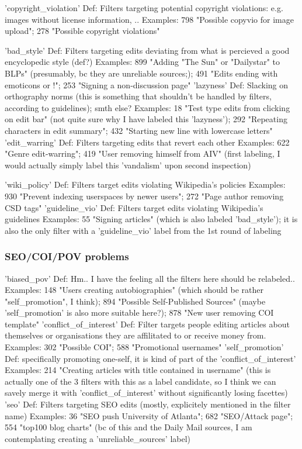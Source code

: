 'copyright\_violation'
  Def: Filters targeting potential copyright violations: e.g. images without license information, ..
  Examples: 798 "Possible copyvio for image upload"; 278 "Possible copyright violations"

'bad\_style'
  Def: Filters targeting edits deviating from what is percieved a good encyclopedic style (def?)
  Examples: 899 "Adding "The Sun" or "Dailystar" to BLPs" (presumably, bc they are unreliable sources;); 491 "Edits ending with emoticons or !"; 253 "Signing a non-discussion page"
'lazyness'
  Def: Slacking on orthography norms (this is something that shouldn't be handled by filters, according to guidelines); smth else?
  Examples: 18 "Test type edits from clicking on edit bar" (not quite sure why I have labeled this 'lazyness'); 292 "Repeating characters in edit summary"; 432 "Starting new line with lowercase letters"
'edit\_warring'
  Def: Filters targeting edits that revert each other
  Examples: 622 "Genre edit-warring"; 419 "User removing himself from AIV" (first labeling, I would actually simply label this 'vandalism' upon second inspection)

'wiki\_policy'
  Def: Filters target edits violating Wikipedia's policies
  Examples: 930 "Prevent indexing userspaces by newer users"; 272 "Page author removing CSD tags"
'guideline\_vio'
  Def: Filters target edits violating Wikipedia's guidelines %
  Examples: 55 "Signing articles" (which is also labeled 'bad\_style'); it is also the only filter with a 'guideline\_vio' label from the 1st round of labeling

\subsubsection{SEO/COI/POV problems}

'biased\_pov'
  Def: Hm.. I have the feeling all the filters here should be relabeled..
  Examples: 148 "Users creating autobiographies" (which should be rather "self\_promotion", I think); 894 "Possible Self-Published Sources" (maybe 'self\_promotion' is also more suitable here?); 878 "New user removing COI template"
'conflict\_of\_interest'
  Def: Filter targets people editing articles about themselves or organisations they are affilitated to or receive money from.
  Examples: 302 "Possible COI"; 588 "Promotional usernames"
'self\_promotion'
  Def: specifically promoting one-self, it is kind of part of the 'conflict\_of\_interest'
  Examples: 214 "Creating articles with title contained in username" (this is actually one of the 3 filters with this as a label candidate, so I think we can savely merge it with 'conflict\_of\_interest' without significantly losing facettes)
'seo'
  Def: Filters targeting SEO edits (mostly, explicitely mentioned in the filter name)
  Examples: 36 "SEO push University of Atlanta"; 682 "SEO/Attack page"; 554 "top100 blog charts" (bc of this and the Daily Mail sources, I am contemplating creating a 'unreliable\_sources' label)

